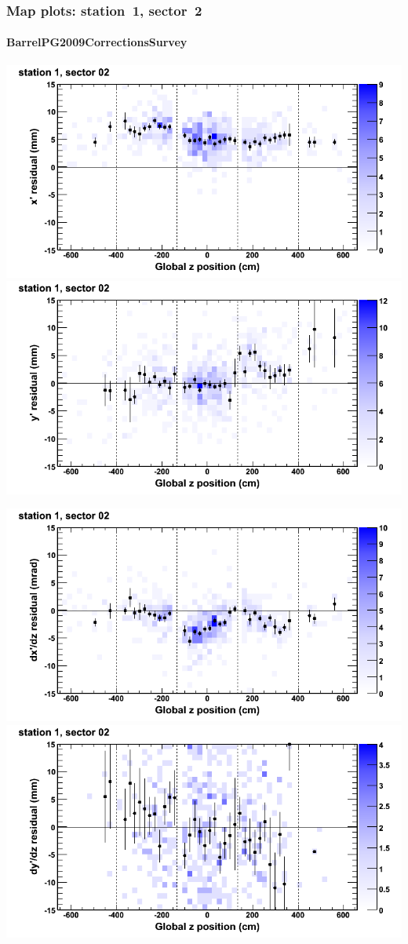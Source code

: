 \documentclass[compress]{beamer}
\begin{document}
\begin{frame}
\frametitle{Map plots: station~1, sector~2}
\framesubtitle{BarrelPG2009CorrectionsSurvey}
\includegraphics[width=0.5\linewidth]{mapplots_01/DTvsz_st1sec02_x.png}
\includegraphics[width=0.5\linewidth]{mapplots_01/DTvsz_st1sec02_y.png}

\includegraphics[width=0.5\linewidth]{mapplots_01/DTvsz_st1sec02_dxdz.png}
\includegraphics[width=0.5\linewidth]{mapplots_01/DTvsz_st1sec02_dydz.png}
\end{frame}
\end{document}
